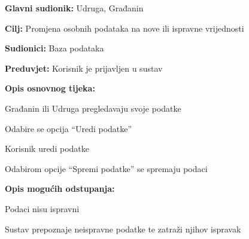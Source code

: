 							
				\noindent {}
					\begin{packed_item}
						
						\item \textbf{Glavni sudionik: }Udruga, Građanin
						\item  \textbf{Cilj:} Promjena osobnih podataka na nove ili ispravne vrijednosti
						\item  \textbf{Sudionici:} Baza podataka
						\item  \textbf{Preduvjet:} Korisnik je prijavljen u sustav
						\item  \textbf{Opis osnovnog tijeka:}
						
						\item[] \begin{packed_enum}
						
							\item Građanin ili Udruga pregledavaju svoje podatke
							\item Odabire se opcija “Uredi podatke”
							\item Korisnik uredi podatke
							\item Odabirom opcije “Spremi podatke” se spremaju podaci
							\end{packed_enum}
						
						\item  \textbf{Opis mogućih odstupanja:}
						
						\item[] \begin{packed_item}
						
							\item[4.a] Podaci nisu ispravni
							\item[] \begin{packed_enum}
								
								\item Sustav prepoznaje neispravne podatke te zatraži njihov ispravak
							
								\end{packed_enum}


							\end{packed_item}
						\end{packed_item}
					
